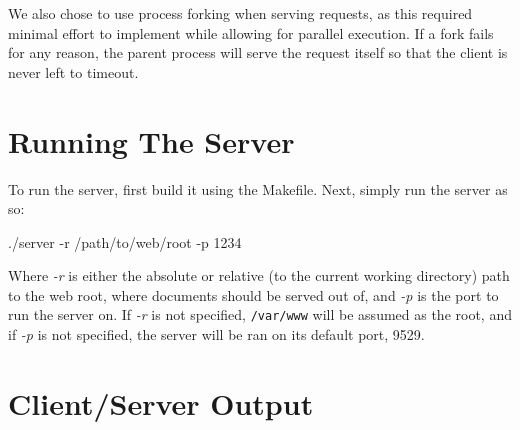 \documentclass[12pt]{article}
\begin{document}
We also chose to use process forking when serving requests, as this required minimal effort to implement while allowing for parallel execution. If a fork fails for any reason, the parent process will serve the request itself so that the client is never left to timeout.

\section{Running The Server}
To run the server, first build it using the Makefile.
Next, simply run the server as so:

./server -r /path/to/web/root -p 1234

Where \emph{-r} is either the absolute or relative (to the current working directory) path to the web root, where documents should be served out of, and \emph{-p} is the port to run the server on. If \emph{-r} is not specified, {\tt /var/www} will be assumed as the root, and if \emph{-p} is not specified, the server will be ran on its default port, 9529.

\section{Client/Server Output}
\end{document}
